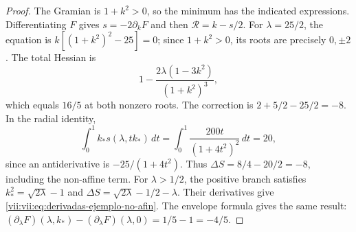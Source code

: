 \begin{proof}
The Gramian is \(1+k^2>0\), so the minimum has the
indicated expressions. Differentiating \(F\) gives
\(s=-2\partial_kF\) and then \(\mathcal R=k-s/2\).
For \(\lambda=25/2\), the equation is
\(k[(1+k^2)^2-25]=0\); since \(1+k^2>0\), its roots
are precisely \(0,\pm2\). The total Hessian is
\[
 1-\frac{2\lambda(1-3k^2)}{(1+k^2)^3},
\]
which equals \(16/5\) at both nonzero roots. The correction is
\(2+5/2-25/2=-8\). In the radial identity,
\[
 \int_0^1 k_*s(\lambda,tk_*)\,dt
    =\int_0^1\frac{200t}{(1+4t^2)^2}\,dt=20,
\]
since an antiderivative is \(-25/(1+4t^2)\).
Thus \(\Delta S=8/4-20/2=-8\), including the non-affine term.
For \(\lambda>1/2\), the positive branch satisfies
\(k_*^2=\sqrt{2\lambda}-1\) and
\(\Delta S=\sqrt{2\lambda}-1/2-\lambda\).
Their derivatives give \eqref{vii:vii:eq:derivadas-ejemplo-no-afin}.
The envelope formula gives the same result:
\((\partial_\lambda F)(\lambda,k_*)
 -(\partial_\lambda F)(\lambda,0)=1/5-1=-4/5\).
\end{proof}
